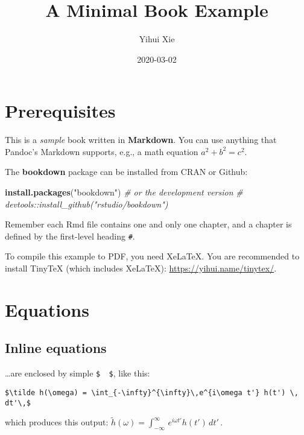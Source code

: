 \documentclass[]{book}
\title{A Minimal Book Example}
\author{Yihui Xie}
\date{2020-03-02}
\newenvironment{Shaded}{\begin{snugshade}}{\end{snugshade}}
\newcommand{\CommentTok}[1]{\textcolor[rgb]{0.56,0.35,0.01}{\textit{#1}}}
\newcommand{\KeywordTok}[1]{\textcolor[rgb]{0.13,0.29,0.53}{\textbf{#1}}}
\newcommand{\NormalTok}[1]{#1}
\newcommand{\StringTok}[1]{\textcolor[rgb]{0.31,0.60,0.02}{#1}}
\begin{document}
\maketitle

{
\setcounter{tocdepth}{1}
\tableofcontents
}
\hypertarget{prerequisites}{%
\chapter{Prerequisites}\label{prerequisites}}

This is a \emph{sample} book written in \textbf{Markdown}. You can use anything that Pandoc's Markdown supports, e.g., a math equation \(a^2 + b^2 = c^2\).

The \textbf{bookdown} package can be installed from CRAN or Github:

\begin{Shaded}
\begin{Highlighting}[]
\KeywordTok{install.packages}\NormalTok{(}\StringTok{"bookdown"}\NormalTok{)}
\CommentTok{# or the development version}
\CommentTok{# devtools::install_github("rstudio/bookdown")}
\end{Highlighting}
\end{Shaded}

Remember each Rmd file contains one and only one chapter, and a chapter is defined by the first-level heading \texttt{\#}.

To compile this example to PDF, you need XeLaTeX. You are recommended to install TinyTeX (which includes XeLaTeX): \url{https://yihui.name/tinytex/}.

\hypertarget{equations}{%
\chapter{Equations}\label{equations}}

\hypertarget{inline-equations}{%
\section{Inline equations}\label{inline-equations}}

\ldots{}are enclosed by simple \texttt{\$\ \ \$}, like this:

\begin{verbatim}
$\tilde h(\omega) = \int_{-\infty}^{\infty}\,e^{i\omega t'} h(t') \, dt'\,$
\end{verbatim}

which produces this output: \(\tilde h(\omega) = \int_{-\infty}^{\infty}\,e^{i\omega t'} h(t') \, dt'\,\).
\end{document}
